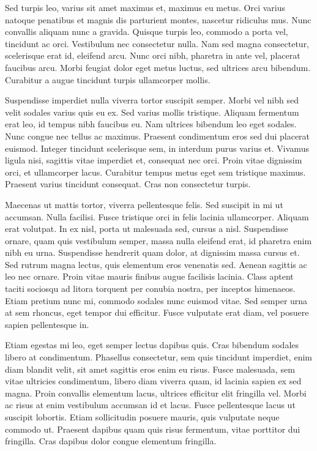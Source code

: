 Sed turpis leo, varius sit amet maximus et, maximus eu metus. Orci varius natoque penatibus et magnis dis parturient montes, nascetur ridiculus mus. Nunc convallis aliquam nunc a gravida. Quisque turpis leo, commodo a porta vel, tincidunt ac orci. Vestibulum nec consectetur nulla. Nam sed magna consectetur, scelerisque erat id, eleifend arcu. Nunc orci nibh, pharetra in ante vel, placerat faucibus arcu. Morbi feugiat dolor eget metus luctus, sed ultrices arcu bibendum. Curabitur a augue tincidunt turpis ullamcorper mollis.

Suspendisse imperdiet nulla viverra tortor suscipit semper. Morbi vel nibh sed velit sodales varius quis eu ex. Sed varius mollis tristique. Aliquam fermentum erat leo, id tempus nibh faucibus eu. Nam ultrices bibendum leo eget sodales. Nunc congue nec tellus ac maximus. Praesent condimentum eros sed dui placerat euismod. Integer tincidunt scelerisque sem, in interdum purus varius et. Vivamus ligula nisi, sagittis vitae imperdiet et, consequat nec orci. Proin vitae dignissim orci, et ullamcorper lacus. Curabitur tempus metus eget sem tristique maximus. Praesent varius tincidunt consequat. Cras non consectetur turpis.

Maecenas ut mattis tortor, viverra pellentesque felis. Sed suscipit in mi ut accumsan. Nulla facilisi. Fusce tristique orci in felis lacinia ullamcorper. Aliquam erat volutpat. In ex nisl, porta ut malesuada sed, cursus a nisl. Suspendisse ornare, quam quis vestibulum semper, massa nulla eleifend erat, id pharetra enim nibh eu urna. Suspendisse hendrerit quam dolor, at dignissim massa cursus et. Sed rutrum magna lectus, quis elementum eros venenatis sed. Aenean sagittis ac leo nec ornare. Proin vitae mauris finibus augue facilisis lacinia. Class aptent taciti sociosqu ad litora torquent per conubia nostra, per inceptos himenaeos. Etiam pretium nunc mi, commodo sodales nunc euismod vitae. Sed semper urna at sem rhoncus, eget tempor dui efficitur. Fusce vulputate erat diam, vel posuere sapien pellentesque in.

Etiam egestas mi leo, eget semper lectus dapibus quis. Cras bibendum sodales libero at condimentum. Phasellus consectetur, sem quis tincidunt imperdiet, enim diam blandit velit, sit amet sagittis eros enim eu risus. Fusce malesuada, sem vitae ultricies condimentum, libero diam viverra quam, id lacinia sapien ex sed magna. Proin convallis elementum lacus, ultrices efficitur elit fringilla vel. Morbi ac risus at enim vestibulum accumsan id et lacus. Fusce pellentesque lacus ut suscipit lobortis. Etiam sollicitudin posuere mauris, quis vulputate neque commodo ut. Praesent dapibus quam quis risus fermentum, vitae porttitor dui fringilla. Cras dapibus dolor congue elementum fringilla.

